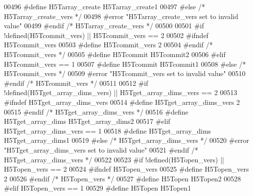 \begin{DoxyCode}
00496 \textcolor{preprocessor}{  #define H5Tarray\_create H5Tarray\_create1}
00497 \textcolor{preprocessor}{#else }\textcolor{comment}{/* H5Tarray\_create\_vers */}\textcolor{preprocessor}{}
00498 \textcolor{preprocessor}{  #error "H5Tarray\_create\_vers set to invalid value"}
00499 \textcolor{preprocessor}{#endif }\textcolor{comment}{/* H5Tarray\_create\_vers */}\textcolor{preprocessor}{}
00500 
00501 \textcolor{preprocessor}{#if !defined(H5Tcommit\_vers) || H5Tcommit\_vers == 2}
00502 \textcolor{preprocessor}{  #ifndef H5Tcommit\_vers}
00503 \textcolor{preprocessor}{    #define H5Tcommit\_vers 2}
00504 \textcolor{preprocessor}{  #endif }\textcolor{comment}{/* H5Tcommit\_vers */}\textcolor{preprocessor}{}
00505 \textcolor{preprocessor}{  #define H5Tcommit H5Tcommit2}
00506 \textcolor{preprocessor}{#elif H5Tcommit\_vers == 1}
00507 \textcolor{preprocessor}{  #define H5Tcommit H5Tcommit1}
00508 \textcolor{preprocessor}{#else }\textcolor{comment}{/* H5Tcommit\_vers */}\textcolor{preprocessor}{}
00509 \textcolor{preprocessor}{  #error "H5Tcommit\_vers set to invalid value"}
00510 \textcolor{preprocessor}{#endif }\textcolor{comment}{/* H5Tcommit\_vers */}\textcolor{preprocessor}{}
00511 
00512 \textcolor{preprocessor}{#if !defined(H5Tget\_array\_dims\_vers) || H5Tget\_array\_dims\_vers == 2}
00513 \textcolor{preprocessor}{  #ifndef H5Tget\_array\_dims\_vers}
00514 \textcolor{preprocessor}{    #define H5Tget\_array\_dims\_vers 2}
00515 \textcolor{preprocessor}{  #endif }\textcolor{comment}{/* H5Tget\_array\_dims\_vers */}\textcolor{preprocessor}{}
00516 \textcolor{preprocessor}{  #define H5Tget\_array\_dims H5Tget\_array\_dims2}
00517 \textcolor{preprocessor}{#elif H5Tget\_array\_dims\_vers == 1}
00518 \textcolor{preprocessor}{  #define H5Tget\_array\_dims H5Tget\_array\_dims1}
00519 \textcolor{preprocessor}{#else }\textcolor{comment}{/* H5Tget\_array\_dims\_vers */}\textcolor{preprocessor}{}
00520 \textcolor{preprocessor}{  #error "H5Tget\_array\_dims\_vers set to invalid value"}
00521 \textcolor{preprocessor}{#endif }\textcolor{comment}{/* H5Tget\_array\_dims\_vers */}\textcolor{preprocessor}{}
00522 
00523 \textcolor{preprocessor}{#if !defined(H5Topen\_vers) || H5Topen\_vers == 2}
00524 \textcolor{preprocessor}{  #ifndef H5Topen\_vers}
00525 \textcolor{preprocessor}{    #define H5Topen\_vers 2}
00526 \textcolor{preprocessor}{  #endif }\textcolor{comment}{/* H5Topen\_vers */}\textcolor{preprocessor}{}
00527 \textcolor{preprocessor}{  #define H5Topen H5Topen2}
00528 \textcolor{preprocessor}{#elif H5Topen\_vers == 1}
00529 \textcolor{preprocessor}{  #define H5Topen H5Topen1}

\end{DoxyCode}
